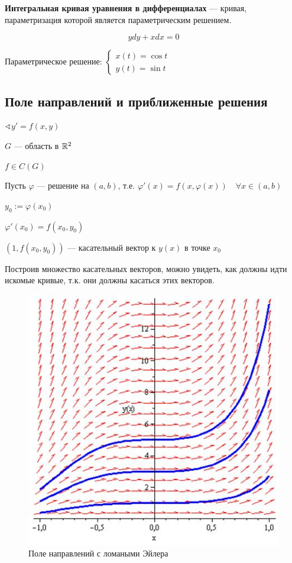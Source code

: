 \begin{definition}
    \textbf{Интегральная кривая уравнения в дифференциалах} --- кривая, параметризация которой является параметрическим решением.
\end{definition}

\begin{example}
    $$ydy + xdx = 0$$

    Параметрическое решение: $\begin{cases}
            x(t) = \cos t \\
            y(t) = \sin t
        \end{cases}$
\end{example}

\subsection{Поле направлений и приближенные решения}

$\sphericalangle y'=f(x, y)$

$G$ --- область в $\mathbb{R}^2$

$f\in C(G)$

Пусть $\varphi$ --- решение на $(a, b)$, т.е. $\varphi'(x) = f(x, \varphi(x)) \quad \forall x\in(a,b)$

$y_0 := \varphi(x_0)$

$\varphi'(x_0) = f(x_0, y_0)$

$(1, f(x_0, y_0))$ --- касательный вектор к $y(x)$ в точке $x_0$

Построив множество касательных векторов, можно увидеть, как должны идти искомые кривые, т.к. они должны касаться этих векторов.

\begin{figure}[h]
    \includegraphics[scale=0.7]{images/dirfield.jpg}
    \centering
    \caption{Поле направлений с ломаными Эйлера}
\end{figure}

